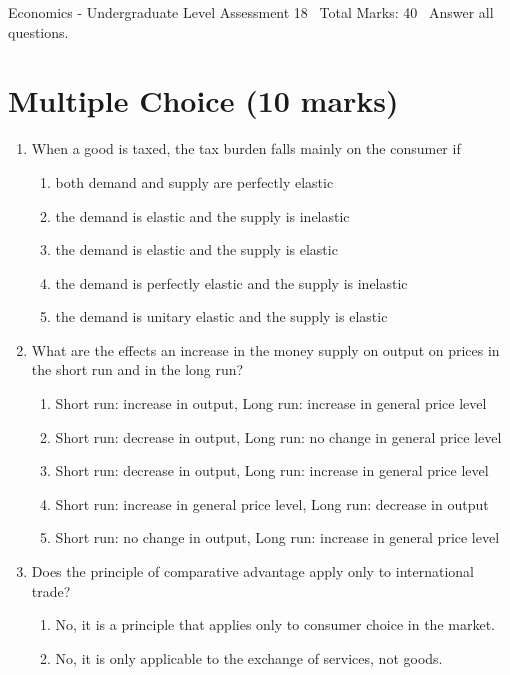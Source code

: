 \documentclass[12pt]{article}
\begin{document}
\begin{center}
Economics - Undergraduate Level Assessment 18 \
Total Marks: 40 \
Answer all questions.
\end{center}

\section*{Multiple Choice (10 marks)}
\begin{enumerate}[label=\arabic*.]
\item When a good is taxed, the tax burden falls mainly on the consumer if
\begin{enumerate}[label=(\alph*)]
    \item both demand and supply are perfectly elastic
    \item the demand is elastic and the supply is inelastic
    \item the demand is elastic and the supply is elastic
    \item the demand is perfectly elastic and the supply is inelastic
    \item the demand is unitary elastic and the supply is elastic
\end{enumerate}
\item What are the effects an increase in the money supply on output on prices in the short run and in the long run?
\begin{enumerate}[label=(\alph*)]
    \item Short run: increase in output, Long run: increase in general price level
    \item Short run: decrease in output, Long run: no change in general price level
    \item Short run: decrease in output, Long run: increase in general price level
    \item Short run: increase in general price level, Long run: decrease in output
    \item Short run: no change in output, Long run: increase in general price level
\end{enumerate}
\item Does the principle of comparative advantage apply only to international trade?
\begin{enumerate}[label=(\alph*)]
    \item No, it is a principle that applies only to consumer choice in the market.
    \item No, it is only applicable to the exchange of services, not goods.

\end{enumerate}
\end{enumerate}
\end{document}
